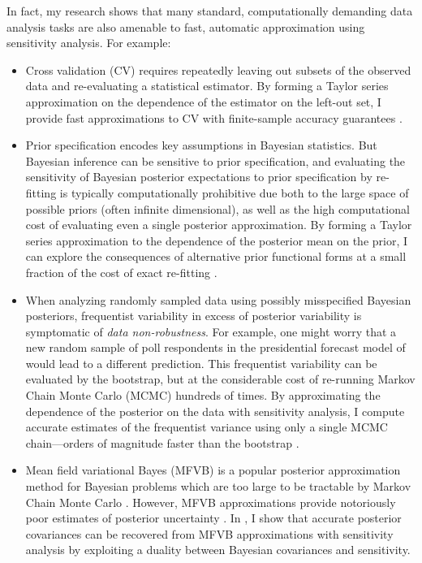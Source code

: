 In fact, my research shows that many standard, computationally demanding data
analysis tasks are also amenable to fast, automatic approximation using
sensitivity analysis. For example:
%
\begin{itemize}
\item Cross validation (CV) requires repeatedly leaving out subsets of the
observed data and re-evaluating a statistical estimator. By forming a Taylor
series approximation on the dependence of the estimator on the left-out set, I
provide fast approximations to CV with finite-sample accuracy guarantees
\citep{giordano:2019:ij}.
%
\item Prior specification encodes key assumptions in Bayesian statistics.  But
Bayesian inference can be sensitive to prior specification, and evaluating the
sensitivity of Bayesian posterior expectations to prior specification by
re-fitting is typically computationally prohibitive due both to the large space
of possible priors (often infinite dimensional), as well as the high
computational cost of evaluating even a single posterior approximation.  By
forming a Taylor series approximation to the dependence of the posterior mean on
the prior, I can explore the consequences of alternative prior functional forms
at a small fraction of the cost of exact re-fitting
\citep{giordano:2020:rstansensitivity, giordano:2021:bnpsensitivity}.
%
\item When analyzing randomly sampled data using possibly misspecified Bayesian
posteriors, frequentist variability in excess of posterior variability is
symptomatic of \emph{data non-robustness}. For example, one might worry that a
new random sample of poll respondents in the presidential forecast model of
\citet{economist:2020:election} would lead to a different prediction.  This
frequentist variability can be evaluated by the bootstrap, but at the
considerable cost of re-running Markov Chain Monte Carlo (MCMC) hundreds of
times.  By approximating the dependence of the posterior on the data with
sensitivity analysis, I compute accurate estimates of the frequentist variance
using only a single MCMC chain---orders of magnitude faster than the bootstrap
\citep{giordano:2020:stanconbayesij}.
%
\item Mean field variational Bayes (MFVB) is a popular posterior approximation
method for Bayesian problems which are too large to be tractable by Markov Chain
Monte Carlo \citep{blei:2017:variational, regier:2019:cataloging}.  However,
MFVB approximations provide notoriously poor estimates of posterior uncertainty
\citep{turner:2011:two}.  In \citet{giordano:2018:covariances}, I show that
accurate posterior covariances can be recovered from MFVB approximations with
sensitivity analysis by exploiting a duality between Bayesian covariances and
sensitivity.
%
\end{itemize}


